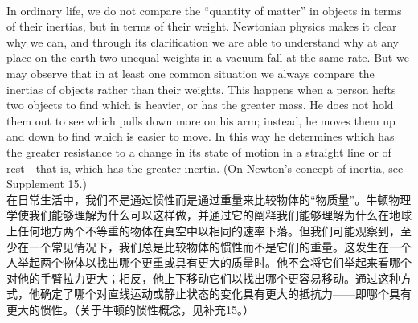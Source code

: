 \documentclass{article}
\begin{document}
\\
In ordinary life, we do not compare the ``quantity of matter'' in objects in terms of their inertias, but in terms of their weight. Newtonian physics makes it clear why we can, and through its clarification we are able to understand why at any place on the earth two unequal weights in a vacuum fall at the same rate. But we may observe that in at least one common situation we always compare the inertias of objects rather than their weights. This happens when a person hefts two objects to find which is heavier, or has the greater mass. He does not hold them out to see which pulls down more on his arm; instead, he moves them up and down to find which is easier to move. In this way he determines which has the greater resistance to a change in its state of motion in a straight line or of rest—that is, which has the greater inertia. (On Newton's concept of inertia, see Supplement 15.)\\
在日常生活中，我们不是通过惯性而是通过重量来比较物体的“物质量”。牛顿物理学使我们能够理解为什么可以这样做，并通过它的阐释我们能够理解为什么在地球上任何地方两个不等重的物体在真空中以相同的速率下落。但我们可能观察到，至少在一个常见情况下，我们总是比较物体的惯性而不是它们的重量。这发生在一个人举起两个物体以找出哪个更重或具有更大的质量时。他不会将它们举起来看哪个对他的手臂拉力更大；相反，他上下移动它们以找出哪个更容易移动。通过这种方式，他确定了哪个对直线运动或静止状态的变化具有更大的抵抗力——即哪个具有更大的惯性。（关于牛顿的惯性概念，见补充15。）\\
\end{document}
